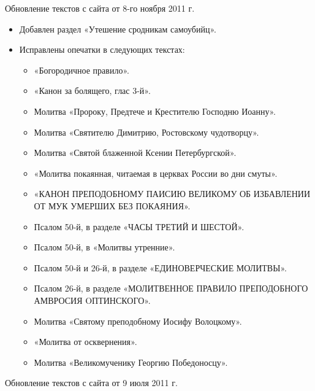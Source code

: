 
Обновление текстов с сайта от 8-го ноября 2011 г.

\begin{itemize}

\item Добавлен раздел «Утешение сродникам самоубийц».
\item Исправлены опечатки в следующих текстах:

\begin{itemize}

\item «Богородичное правило».
\item «Канон за болящего, глас 3-й».
\item Молитва «Пророку, Предтече и Крестителю Господню Иоанну».
\item Молитва «Святителю Димитрию, Ростовскому чудотворцу».
\item Молитва «Святой блаженной Ксении Петербургской».
\item «Молитва покаянная, читаемая в церквах России во дни смуты».
\item «КАНОН ПРЕПОДОБНОМУ ПАИСИЮ ВЕЛИКОМУ ОБ ИЗБАВЛЕНИИ ОТ МУК УМЕРШИХ БЕЗ ПОКАЯНИЯ».
\item Псалом 50-й, в разделе «ЧАСЫ ТРЕТИЙ И ШЕСТОЙ».
\item Псалом 50-й, в «Молитвы утренние».
\item Псалом 50-й и 26-й, в разделе «ЕДИНОВЕРЧЕСКИЕ МОЛИТВЫ».
\item Псалом 26-й, в разделе «МОЛИТВЕННОЕ ПРАВИЛО ПРЕПОДОБНОГО АМВРОСИЯ OПТИНСКОГО».
\item Молитва «Святому преподобному Иосифу Волоцкому».
\item «Молитва от осквернения».
\item Молитва «Великомученику Георгию Победоносцу».
\end{itemize}

\end{itemize}


Обновление текстов с сайта от 9 июля 2011 г.

